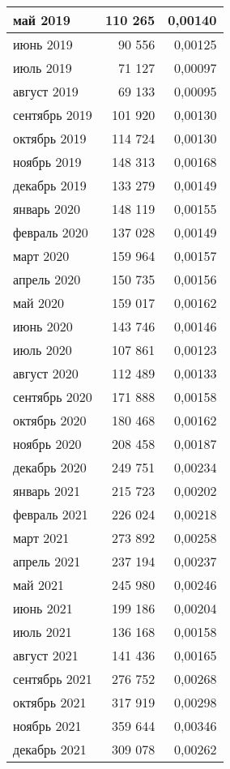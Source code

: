 \begin{longtable}[h!]{|l|r|r|}
май 2019 & 110 265 & 0,00140 \\ \hline
июнь 2019 & 90 556 & 0,00125 \\ \hline
июль 2019 & 71 127 & 0,00097 \\ \hline
август 2019 & 69 133 & 0,00095 \\ \hline
сентябрь 2019 & 101 920 & 0,00130 \\ \hline
октябрь 2019 & 114 724 & 0,00130 \\ \hline
ноябрь 2019 & 148 313 & 0,00168 \\ \hline
декабрь 2019 & 133 279 & 0,00149 \\ \hline
январь 2020 & 148 119 & 0,00155 \\ \hline
февраль 2020 & 137 028 & 0,00149 \\ \hline
март 2020 & 159 964 & 0,00157 \\ \hline
апрель 2020 & 150 735 & 0,00156 \\ \hline
май 2020 & 159 017 & 0,00162 \\ \hline
июнь 2020 & 143 746 & 0,00146 \\ \hline
июль 2020 & 107 861 & 0,00123 \\ \hline
август 2020 & 112 489 & 0,00133 \\ \hline
сентябрь 2020 & 171 888 & 0,00158 \\ \hline
октябрь 2020 & 180 468 & 0,00162 \\ \hline
ноябрь 2020 & 208 458 & 0,00187 \\ \hline
декабрь 2020 & 249 751 & 0,00234 \\ \hline
январь 2021 & 215 723 & 0,00202 \\ \hline
февраль 2021 & 226 024 & 0,00218 \\ \hline
март 2021 & 273 892 & 0,00258 \\ \hline
апрель 2021 & 237 194 & 0,00237 \\ \hline
май 2021 & 245 980 & 0,00246 \\ \hline
июнь 2021 & 199 186 & 0,00204 \\ \hline
июль 2021 & 136 168 & 0,00158 \\ \hline
август 2021 & 141 436 & 0,00165 \\ \hline
сентябрь 2021 & 276 752 & 0,00268 \\ \hline
октябрь 2021 & 317 919 & 0,00298 \\ \hline
ноябрь 2021 & 359 644 & 0,00346 \\ \hline
декабрь 2021 & 309 078 & 0,00262 \\ \hline

\end{longtable}
